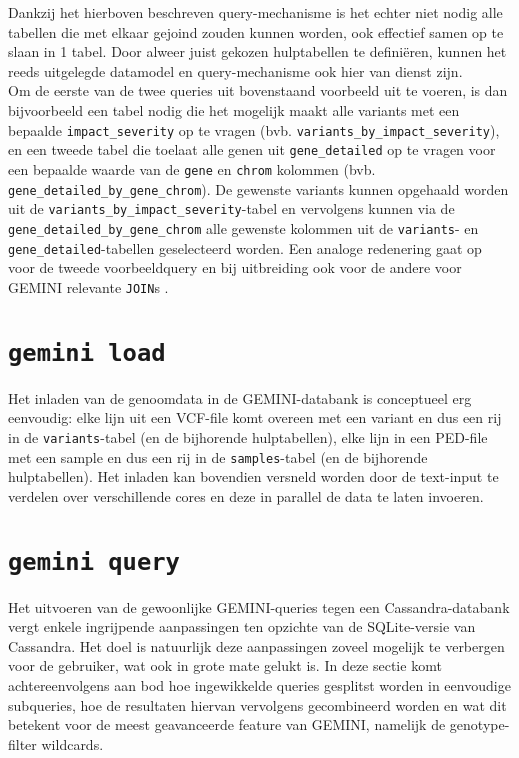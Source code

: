 

Dankzij het hierboven beschreven query-mechanisme is het echter niet nodig alle tabellen die met elkaar gejoind zouden kunnen worden, ook effectief samen op te slaan in 1 tabel. Door alweer juist gekozen hulptabellen te defini\"eren, kunnen het reeds uitgelegde datamodel en query-mechanisme ook hier van dienst zijn.\\
Om de eerste van de twee queries uit bovenstaand voorbeeld uit te voeren, is dan bijvoorbeeld een tabel nodig die het mogelijk maakt alle variants met een bepaalde \texttt{impact\_severity} op te vragen (bvb. \texttt{variants\_by\_impact\_severity}), en een tweede tabel die toelaat alle genen uit \texttt{gene\_detailed} op te vragen voor een bepaalde waarde van de \texttt{gene} en \texttt{chrom} kolommen (bvb. \texttt{gene\_detailed\_by\_gene\_chrom}). De gewenste variants kunnen opgehaald worden uit de \texttt{variants\_by\_impact\_severity}-tabel en vervolgens kunnen via de \texttt{gene\_detailed\_by\_gene\_chrom} alle gewenste kolommen uit de \texttt{variants}- en \texttt{gene\_detailed}-tabellen geselecteerd worden. Een analoge redenering gaat op voor de tweede voorbeeldquery en bij uitbreiding ook voor de andere voor GEMINI relevante \texttt{JOIN}s \cite{gemini_joins}.

\section{\texttt{gemini load}}

Het inladen van de genoomdata in de GEMINI-databank is conceptueel erg eenvoudig: elke lijn uit een VCF-file komt overeen met een variant en dus een rij in de \texttt{variants}-tabel (en de bijhorende hulptabellen), elke lijn in een PED-file met een sample en dus een rij in de \texttt{samples}-tabel (en de bijhorende hulptabellen). Het inladen kan bovendien versneld worden door de text-input te verdelen over verschillende cores en deze in parallel de data te laten invoeren.

\section{\texttt{gemini query}}
\label{gemini_query_concept}
Het uitvoeren van de gewoonlijke GEMINI-queries tegen een Cassandra-databank vergt enkele ingrijpende aanpassingen ten opzichte van de SQLite-versie van Cassandra. Het doel is natuurlijk deze aanpassingen zoveel mogelijk te verbergen voor de gebruiker, wat ook in grote mate gelukt is. In deze sectie komt achtereenvolgens aan bod hoe ingewikkelde queries gesplitst worden in eenvoudige subqueries, hoe de resultaten hiervan vervolgens gecombineerd worden en wat dit betekent voor de meest geavanceerde feature van GEMINI, namelijk de genotype-filter wildcards.


